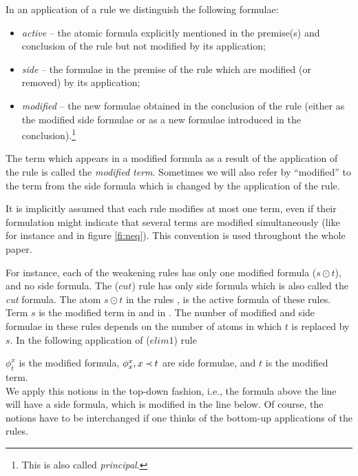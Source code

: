 \begin{DEFINITION} In an application of a rule we distinguish the following
formulae:
\begin{itemize}\MyLPar
\item {\em active} -- the atomic formula explicitly mentioned in the premise(s)
and conclusion of the rule but not modified by its application;
\item {\em side} -- the formulae in the premise of the rule which are modified
(or removed) by its application;
\item {\em modified} -- the new formulae obtained in the conclusion of the rule
(either as the modified side formulae or as a new formulae introduced in the 
conclusion).\footnote{This is also called {\em principal}.}
\end{itemize}
\end{DEFINITION}
\noindent
The term which appears in a modified formula as a 
result of the application of the rule is called the {\em modified
term}. Sometimes we will also refer by ``modified'' to the term from the side
formula which is changed by the application of the rule.

It is implicitly assumed that each rule modifies at most one term, even if
their formulation might indicate that several terms are modified
simultaneously (like for instance  and  in figure \ref{fi:neq}). This
convention is used throughout the whole paper.
\begin{EXAMPLE}
For instance, each of the weakening rules 
has only one modified formula ($s\odot t$), and no side formula.
The ($cut$) rule  has only side formula which is
also called the {\em cut} formula. The atom $s\odot t$ in the rules , 
 is the active formula of these rules. 
Term $s$ is the modified term in
 and in . The number of modified and side formulae in
these rules depends on the number of atoms in which $t$ is replaced by $s$. 
In the following application of ($elim1$) rule 
\begin{center}
\end{center}
\noindent $\phi_t^x$ is the modified formula, $\phi_x^x, x\mathbin{\prec} t$ are side formulae, 
and $t$ is the modified term.\\
We apply this notions in the top-down fashion, i.e., the formula above the
line will have a side formula, which is modified in the line below. Of
course, the notions have to be interchanged if one thinks of the bottom-up
applications of the rules.
\end{EXAMPLE}


